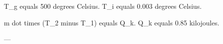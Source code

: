 T_g equals 500 degrees Celsius.  
T_i equals 0.003 degrees Celsius.  

m dot times (T_2 minus T_1) equals Q_k.  
Q_k equals 0.85 kilojoules.  

---